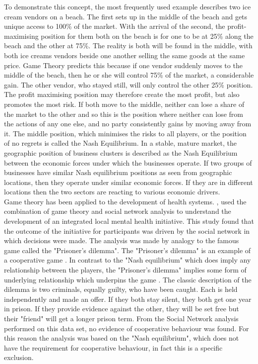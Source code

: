 \documentclass[11pt,a4paper]{article}
\begin{document}
To demonstrate this concept, the most frequently used example describes two ice cream vendors on a beach. The first sets up in the middle of the beach and gets unique access to 100\% of the market. With the arrival of the second, the profit-maximising position for them both on the beach is for one to be at 25\% along the beach and the other at 75\%. The reality is both will be found in the middle, with both ice creams vendors beside one another selling the same goods at the same price. Game Theory predicts this because if one vendor suddenly moves to the middle of the beach, then he or she will control 75\% of the market, a considerable gain. The other vendor, who stayed still, will only control the other 25\% position. The profit maximising position may therefore create the most profit, but also promotes the most risk. If both move to the middle, neither can lose a share of the market to the other and so this is the position where neither can lose from the actions of any one else, and no party consistently gains by moving away from it. The middle position, which minimises the risks to all players, or the position of no regrets is called the Nash Equilibrium. In a stable, mature market, the geographic position of business clusters is described as the Nash Equilibrium between the economic forces under which the businesses operate. If two groups of businesses have similar Nash equilibrium positions as seen from geographic locations, then they operate under similar economic forces. If they are in different locations then the two sectors are reacting to various economic drivers. \\

Game theory has been applied to the development of health systems. \citep{dobson2004sustainable}, used the combination of game theory and social network analysis to understand the development of an integrated local mental health initiative. This study found that the outcome of the initiative for participants was driven by the social network in which decisions were made. The analysis was made by analogy to the famous game called the "Prisoner's dilemma". The "Prisoner's dilemma" is an example of a cooperative game \citep{binmore2007}. In contrast to the "Nash equilibrium" which does imply any relationship between the players, the "Prisoner's dilemma" implies some form of underlying relationship which underpins the game \citep{binmore2007game}. The classic description of the dilemma is two criminals, equally guilty, who have been caught. Each is held independently and made an offer. If they both stay silent, they both get one year in prison. If they provide evidence against the other, they will be set free but their "friend" will get a longer prison term. From the Social Network analysis performed on this data set, no evidence of cooperative behaviour was found. For this reason the analysis was based on the "Nash equilibrium", which does not have the requirement for cooperative behaviour, in fact this is a specific exclusion. \\
\end{document}

